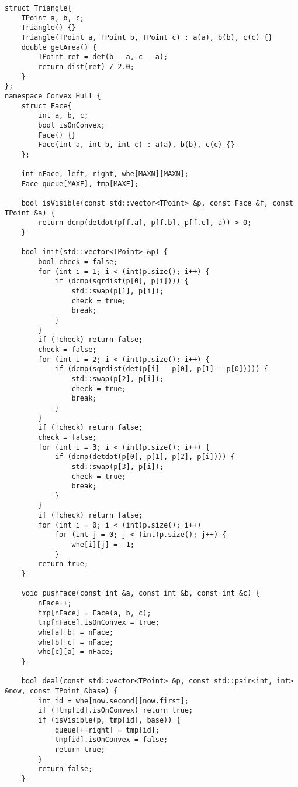 \begin{lstlisting}
struct Triangle{
	TPoint a, b, c;
	Triangle() {}
	Triangle(TPoint a, TPoint b, TPoint c) : a(a), b(b), c(c) {}
	double getArea() {
		TPoint ret = det(b - a, c - a);
		return dist(ret) / 2.0;
	}
};
namespace Convex_Hull {
	struct Face{
		int a, b, c;
		bool isOnConvex;
		Face() {}
		Face(int a, int b, int c) : a(a), b(b), c(c) {}
	};

	int nFace, left, right, whe[MAXN][MAXN];
	Face queue[MAXF], tmp[MAXF];

	bool isVisible(const std::vector<TPoint> &p, const Face &f, const TPoint &a) {
		return dcmp(detdot(p[f.a], p[f.b], p[f.c], a)) > 0;
	}

	bool init(std::vector<TPoint> &p) {
		bool check = false;
		for (int i = 1; i < (int)p.size(); i++) {
			if (dcmp(sqrdist(p[0], p[i]))) {
				std::swap(p[1], p[i]);
				check = true;
				break;
			}
		}
		if (!check) return false;
		check = false;
		for (int i = 2; i < (int)p.size(); i++) {
			if (dcmp(sqrdist(det(p[i] - p[0], p[1] - p[0])))) {
				std::swap(p[2], p[i]);
				check = true;
				break;
			}
		}
		if (!check) return false;
		check = false;
		for (int i = 3; i < (int)p.size(); i++) {
			if (dcmp(detdot(p[0], p[1], p[2], p[i]))) {
				std::swap(p[3], p[i]);
				check = true;
				break;
			}
		}
		if (!check) return false;
		for (int i = 0; i < (int)p.size(); i++)
			for (int j = 0; j < (int)p.size(); j++) {
				whe[i][j] = -1;
			}
		return true;
	}

	void pushface(const int &a, const int &b, const int &c) {
		nFace++;
		tmp[nFace] = Face(a, b, c);
		tmp[nFace].isOnConvex = true;
		whe[a][b] = nFace;
		whe[b][c] = nFace;
		whe[c][a] = nFace;
	}

	bool deal(const std::vector<TPoint> &p, const std::pair<int, int> &now, const TPoint &base) {
		int id = whe[now.second][now.first];
		if (!tmp[id].isOnConvex) return true;
		if (isVisible(p, tmp[id], base)) {
			queue[++right] = tmp[id];
			tmp[id].isOnConvex = false;
			return true;
		}
		return false;
	}


\end{lstlisting}
